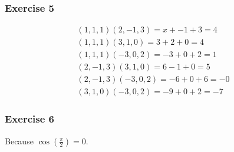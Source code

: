 \documentclass[../main.tex]{subfiles}
\begin{document}
\subsubsection{Exercise 5}

\begin{equation}
\begin{array}{l}
(1,1,1)(2,-1,3)=x+-1+3=4 \\
(1,1,1)(3,1,0)=3+2+0=4 \\
(1,1,1)(-3,0,2)=-3+0+2=1 \\
(2,-1,3)(3,1,0)=6-1+0=5 \\
(2,-1,3)(-3,0,2)=-6+0+6=-0 \\
(3,1,0)(-3,0,2)=-9+0+2=-7
\end{array}
\end{equation}

\subsubsection{Exercise 6}
Because $\cos(\frac{\pi}{2}) = 0$.
\end{document}
